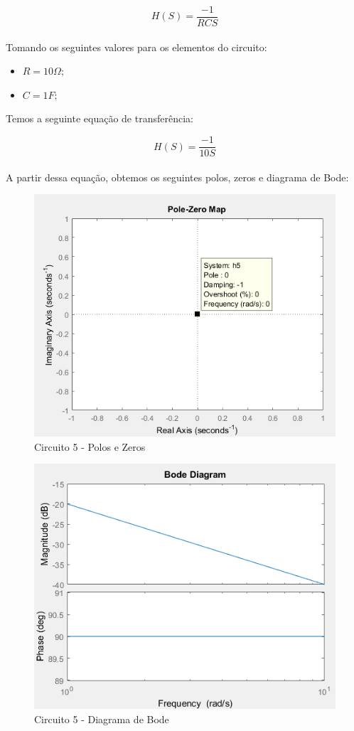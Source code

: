 \documentclass[a4paper, 12pt]{article}
\begin{document}
			\[
			H(S) = \frac{-1}{RCS}
			\] 	\\

			Tomando os seguintes valores para os elementos do circuito:
			\begin{itemize}
				\item $R = 10\Omega;$
				\item $C = 1F;$
			\end{itemize}

			Temos a seguinte equação de transferência:

			\[
			H(S) = \frac{-1}{10S}
			\] 	\\

			A partir dessa equação, obtemos os seguintes polos, zeros e diagrama de Bode:

			\begin{figure}[!ht]
				\centering
				\includegraphics[scale=0.75]{img/1e_circ5.png}
				\caption{Circuito 5 - Polos e Zeros}
			\end{figure}
			\newpage
			\begin{figure}[!ht]
				\centering
				\includegraphics[scale=0.78]{img/1f_circ5.png}
				\caption{Circuito 5 - Diagrama de Bode}
			\end{figure}
\end{document}
